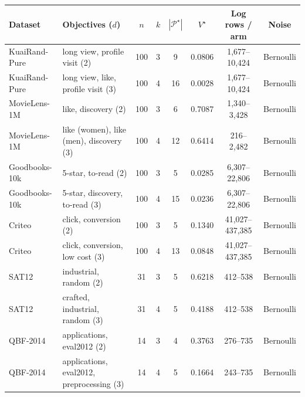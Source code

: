 \begin{tabular}{llcccccc}
\toprule
Dataset & Objectives ($d$) & $n$ & $k$ & $|\mathcal{P}^\star|$ & $V^\star$ & Log rows / arm & Noise\\
\midrule
KuaiRand-Pure & long view, profile visit (2) & 100 & 3 & 9 & 0.0806 & 1,677--10,424 & Bernoulli\\
KuaiRand-Pure & long view, like, profile visit (3) & 100 & 4 & 16 & 0.0028 & 1,677--10,424 & Bernoulli\\
MovieLens-1M & like, discovery (2) & 100 & 3 & 6 & 0.7087 & 1,340--3,428 & Bernoulli\\
MovieLens-1M & like (women), like (men), discovery (3) & 100 & 4 & 12 & 0.6414 & 216--2,482 & Bernoulli\\
Goodbooks-10k & 5-star, to-read (2) & 100 & 3 & 5 & 0.0285 & 6,307--22,806 & Bernoulli\\
Goodbooks-10k & 5-star, discovery, to-read (3) & 100 & 4 & 15 & 0.0236 & 6,307--22,806 & Bernoulli\\
Criteo & click, conversion (2) & 100 & 3 & 5 & 0.1340 & 41,027--437,385 & Bernoulli\\
Criteo & click, conversion, low cost (3) & 100 & 4 & 13 & 0.0848 & 41,027--437,385 & Bernoulli\\
SAT12 & industrial, random (2) & 31 & 3 & 5 & 0.6218 & 412--538 & Bernoulli\\
SAT12 & crafted, industrial, random (3) & 31 & 4 & 5 & 0.4188 & 412--538 & Bernoulli\\
QBF-2014 & applications, eval2012 (2) & 14 & 3 & 4 & 0.3763 & 276--735 & Bernoulli\\
QBF-2014 & applications, eval2012, preprocessing (3) & 14 & 4 & 5 & 0.1664 & 243--735 & Bernoulli\\
\bottomrule
\end{tabular}
